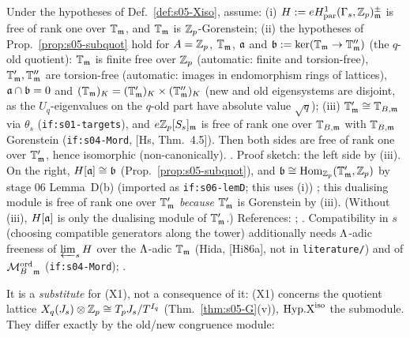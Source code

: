 \begin{proposition}\label{prop:s05-Xiso}
Under the hypotheses of Def.~\ref{def:s05-Xiso}, assume:
(i) $H:=eH^1_{\rm par}(\Gamma_s,\mathbb{Z}_p)^{\pm}_{\mathfrak{m}}$ is free of rank one over $\mathbb{T}_{\mathfrak{m}}$, and $\mathbb{T}_{\mathfrak{m}}$ is $\mathbb{Z}_p$-Gorenstein;
(ii) the hypotheses of Prop.~\ref{prop:s05-subquot} hold for $A=\mathbb{Z}_p$, $\mathbb{T}_{\mathfrak{m}}$, $\mathfrak{a}$ and $\mathfrak{b}:=\ker(\mathbb{T}_{\mathfrak{m}}\to\mathbb{T}''_{\mathfrak{m}})$ (the $q$-old
quotient): $\mathbb{T}_{\mathfrak{m}}$ is finite free over $\mathbb{Z}_p$ (automatic: finite and torsion-free), $\mathbb{T}'_{\mathfrak{m}},\mathbb{T}''_{\mathfrak{m}}$ are torsion-free (automatic: images in
endomorphism rings of lattices), $\mathfrak{a}\cap\mathfrak{b}=0$ and $(\mathbb{T}_{\mathfrak{m}})_K=(\mathbb{T}'_{\mathfrak{m}})_K\times(\mathbb{T}''_{\mathfrak{m}})_K$ (new and old eigensystems are disjoint,
as the $U_q$-eigenvalues on the $q$-old part have absolute value $\sqrt q$);
(iii) $\mathbb{T}'_{\mathfrak{m}}\cong\mathbb{T}_{B,\mathfrak{m}}$ via $\theta_s$ (\texttt{if:s01-targets}), and $e\mathbb{Z}_p[S_s]_{\mathfrak{m}}$ is free of rank one over $\mathbb{T}_{B,\mathfrak{m}}$ with
$\mathbb{T}_{B,\mathfrak{m}}$ Gorenstein (\texttt{if:s04-Mord}, [Hs, Thm.~4.5]).
Then both sides are free of rank one over $\mathbb{T}'_{\mathfrak{m}}$, hence isomorphic (non-canonically). \stpmc{}.
Proof sketch: the left side by (iii). On the right, $H[\mathfrak{a}]\cong\mathfrak{b}$ (Prop.~\ref{prop:s05-subquot}), and $\mathfrak{b}\cong\operatorname{Hom}_{\mathbb{Z}_p}(\mathbb{T}'_{\mathfrak{m}},\mathbb{Z}_p)$
by stage 06 Lemma~D(b) (imported as \texttt{if:s06-lemD}; this uses (i))
; this dualising module is free of rank one over $\mathbb{T}'_{\mathfrak{m}}$ \emph{because} $\mathbb{T}'_{\mathfrak{m}}$ is Gorenstein
by (iii). (Without (iii), $H[\mathfrak{a}]$ is only the dualising module of $\mathbb{T}'_{\mathfrak{m}}$.) References:
; .
Compatibility in $s$ (choosing compatible generators along the tower) additionally needs $\Lambda$-adic freeness of
$\varprojlim_s H$ over the $\Lambda$-adic $\mathbb{T}_{\mathfrak{m}}$ (Hida, [Hi86a], not in \texttt{literature/}) and of ${\mathcal{M}^{\mathrm{ord}}_B}_{\mathfrak{m}}$ (\texttt{if:s04-Mord});
\stsketch.
\end{proposition}
It is a \emph{substitute} for (X1), not a consequence of it: (X1) concerns the quotient lattice
$X_q(J_s)\otimes\mathbb{Z}_p\cong T_pJ_s/T^{I_q}$ (Thm.~\ref{thm:s05-G}(v)), $\mathrm{Hyp.X}^{\mathrm{iso}}$ the submodule. They differ exactly by the old/new
congruence module:

